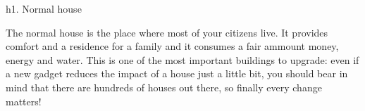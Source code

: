 h1. Normal house

The normal house is the place where most of your citizens live. It provides comfort and a residence for a family and it consumes a fair ammount money, energy and water. This is one of the most important buildings to upgrade: even if a new gadget reduces the impact of a house just a little bit, you should bear in mind that there are hundreds of houses out there, so finally every change matters!